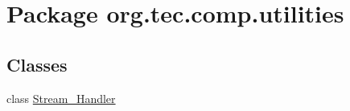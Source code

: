 \hypertarget{namespaceorg_1_1tec_1_1comp_1_1utilities}{}\section{Package org.\+tec.\+comp.\+utilities}
\label{namespaceorg_1_1tec_1_1comp_1_1utilities}
\subsection*{Classes}
\begin{DoxyCompactItemize}
\item 
class \mbox{\hyperlink{classorg_1_1tec_1_1comp_1_1utilities_1_1_stream___handler}{Stream\+\_\+\+Handler}}
\end{DoxyCompactItemize}
